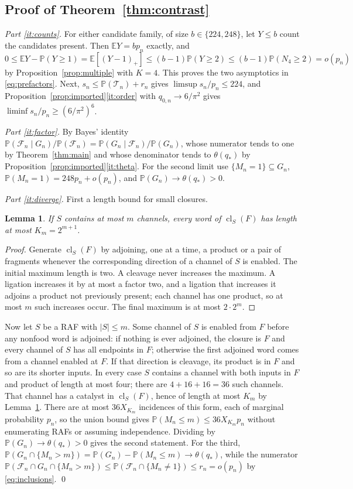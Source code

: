 \documentclass[11pt,letterpaper]{article}
\theoremstyle{plain}
\newtheorem{lemma}[theorem]{Lemma}
\theoremstyle{definition}
\theoremstyle{remark}
\numberwithin{equation}{section}
\newcommand{\PP}{\mathbb P}
\newcommand{\EE}{\mathbb E}
\newcommand{\cF}{\mathcal F}
\newcommand{\cT}{\mathcal T}
\newcommand{\cl}{\operatorname{cl}}
\newcommand{\thetaq}{\theta(q_*)}
\begin{document}
\subsection{Proof of Theorem~\ref{thm:contrast}}
\emph{Part \ref{it:counts}.} For either candidate family, of size $b\in\{224,248\}$, let $Y\le b$ count the candidates present. Then $\EE Y=bp_n$ exactly, and
\[
 0\le\EE Y-\PP(Y\ge1)=\EE[(Y-1)_+]\le(b-1)\PP(Y\ge2)\le(b-1)\PP(N_4\ge2)=o(p_n)
\]
by Proposition~\ref{prop:multiple} with $K=4$. This proves the two asymptotics in \eqref{eq:prefactors}. Next, $s_n\le\PP(\cT_n)+r_n$ gives $\limsup s_n/p_n\le224$, and Proposition~\ref{prop:imported}\ref{it:order} with $q_{0,n}\to6/\pi^2$ gives $\liminf s_n/p_n\ge(6/\pi^2)^6$.

\emph{Part \ref{it:factor}.} By Bayes' identity $\PP(\cF_n\mid G_n)/\PP(\cF_n)=\PP(G_n\mid\cF_n)/\PP(G_n)$, whose numerator tends to one by Theorem~\ref{thm:main} and whose denominator tends to $\thetaq$ by Proposition~\ref{prop:imported}\ref{it:theta}. For the second limit use $\{M_n=1\}\subseteq G_n$, $\PP(M_n=1)=248p_n+o(p_n)$, and $\PP(G_n)\to\thetaq>0$.

\emph{Part \ref{it:diverge}.} First a length bound for small closures.
\begin{lemma}\label{lem:closurelength}
If $S$ contains at most $m$ channels, every word of $\cl_S(F)$ has length at most $K_m=2^{m+1}$.
\end{lemma}
\begin{proof}
Generate $\cl_S(F)$ by adjoining, one at a time, a product or a pair of fragments whenever the corresponding direction of a channel of $S$ is enabled. The initial maximum length is two. A cleavage never increases the maximum. A ligation increases it by at most a factor two, and a ligation that increases it adjoins a product not previously present; each channel has one product, so at most $m$ such increases occur. The final maximum is at most $2\cdot2^m$.
\end{proof}
Now let $S$ be a RAF with $|S|\le m$. Some channel of $S$ is enabled from $F$ before any nonfood word is adjoined: if nothing is ever adjoined, the closure is $F$ and every channel of $S$ has all endpoints in $F$; otherwise the first adjoined word comes from a channel enabled at $F$. If that direction is cleavage, its product is in $F$ and so are its shorter inputs. In every case $S$ contains a channel with both inputs in $F$ and product of length at most four; there are $4+16+16=36$ such channels. That channel has a catalyst in $\cl_S(F)$, hence of length at most $K_m$ by Lemma~\ref{lem:closurelength}. There are at most $36X_{K_m}$ incidences of this form, each of marginal probability $p_n$, so the union bound gives $\PP(M_n\le m)\le36X_{K_m}p_n$ without enumerating RAFs or assuming independence. Dividing by $\PP(G_n)\to\thetaq>0$ gives the second statement. For the third, $\PP(G_n\cap\{M_n>m\})=\PP(G_n)-\PP(M_n\le m)\to\thetaq$, while the numerator $\PP(\cF_n\cap G_n\cap\{M_n>m\})\le\PP(\cF_n\cap\{M_n\ne1\})\le r_n=o(p_n)$ by \eqref{eq:inclusions}. \qed
\end{document}
